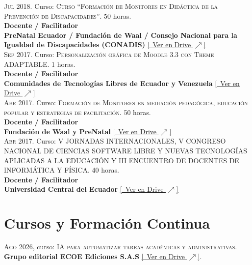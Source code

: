\documentclass[a4paper]{article}
\begin{document}
\textsc{Jul} 2018. Curso: \textsc{Curso “Formación de Monitores en Didáctica de la Prevención de Discapacidades”}. 50 horas.\\
\textbf{Docente / Facilitador}\\
\textbf{PreNatal Ecuador / Fundación de Waal / Consejo Nacional para la Igualdad de Discapacidades (CONADIS)} \small \href{https://drive.google.com/file/d/13c7FuzS205OqHZ2mF_ZDMtt1VOtQGbIM/view}{[\faGoogleDrive~Ver en Drive $\nearrow$]} \\[4pt]

\textsc{Sep} 2017. Curso: \textsc{Personalización gráfica de Moodle 3.3 con Theme ADAPTABLE}. 1 horas.\\
\textbf{Docente / Facilitador}\\
\textbf{Comunidades de Tecnologías Libres de Ecuador y Venezuela} \small \href{https://drive.google.com/file/d/1BXRw-dvLTyEFJyIOdSybD24iE70t5x2k/view}{[\faGoogleDrive~Ver en Drive $\nearrow$]} \\[4pt]

\textsc{Abr} 2017. Curso: \textsc{Formación de Monitores en mediación pedagógica, educación popular y estrategias de facilitación}. 50 horas.\\
\textbf{Docente / Facilitador}\\
\textbf{Fundación de Waal y PreNatal} \small \href{https://drive.google.com/file/d/1RQFkMFLlRCK3BUBwCg4iIAJ7GuMJOyjL/view}{[\faGoogleDrive~Ver en Drive $\nearrow$]} \\[4pt]

\textsc{Abr} 2017. Curso: \textsc{V JORNADAS INTERNACIONALES, V CONGRESO NACIONAL DE CIENCIAS SOFTWARE LIBRE Y NUEVAS TECNOLOGÍAS APLICADAS A LA EDUCACIÓN Y III ENCUENTRO DE DOCENTES DE INFORMÁTICA Y FÍSICA}. 40 horas.\\
\textbf{Docente / Facilitador}\\
\textbf{Universidad Central del Ecuador} \small \href{https://drive.google.com/file/d/1zlJ_-qw9ExyUZd9H9rQuhi0IkPlWXcJ1/view}{[\faGoogleDrive~Ver en Drive $\nearrow$]} \\[4pt]






\section{Cursos y Formación Continua}

\textsc{Ago} 2026, curso: \textsc{IA para automatizar tareas académicas y administrativas}.
\textbf{Grupo editorial ECOE Ediciones S.A.S} \small \href{https://drive.google.com/file/d/1AQmSyfNTRBn914R3grR_0xcN2r0PkgWi/view}{[\faGoogleDrive~Ver en Drive $\nearrow$]}.
\end{document}

